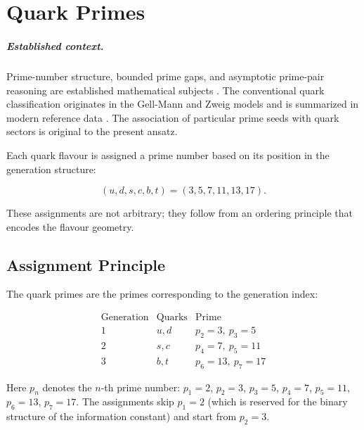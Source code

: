 \chapter{Quark Primes}
\label{ch:quark_primes}


\paragraph{Established context.}
Prime-number structure, bounded prime gaps, and asymptotic prime-pair reasoning
are established mathematical subjects \cite{HardyLittlewood1923,Zhang2014,Polymath2014,Maynard2015,HardyWright2008}.
The conventional quark classification originates in the Gell-Mann and Zweig
models and is summarized in modern reference data \cite{GellMann1964,Zweig1964,PDG2024}.
The association of particular prime seeds with quark sectors is original to the
present ansatz.

Each quark flavour is assigned a prime number based on its position in
the generation structure:

\begin{equation}
(u,d,s,c,b,t) = (3,5,7,11,13,17).
\label{eq:quark_primes}
\end{equation}

These assignments are not arbitrary; they follow from an ordering principle
that encodes the flavour geometry.

\section{Assignment Principle}

The quark primes are the primes corresponding to the generation index:

\[
\begin{array}{c|c|c}
\text{Generation} & \text{Quarks} & \text{Prime} \\ \hline
1 & u, d & p_2 = 3,\ p_3 = 5 \\
2 & s, c & p_4 = 7,\ p_5 = 11 \\
3 & b, t & p_6 = 13,\ p_7 = 17
\end{array}
\]

Here \(p_n\) denotes the \(n\)-th prime number: \(p_1 = 2\), \(p_2 = 3\),
\(p_3 = 5\), \(p_4 = 7\), \(p_5 = 11\), \(p_6 = 13\), \(p_7 = 17\).
The assignments skip \(p_1 = 2\) (which is reserved for the binary structure
of the information constant) and start from \(p_2 = 3\).

